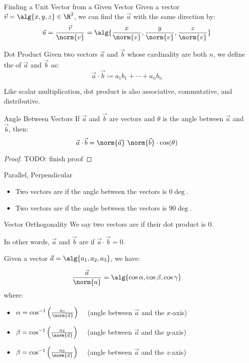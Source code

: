 \begin{tecbox}{Finding a Unit Vector from a Given Vector}{}
    Given a vector $\vec{v} = \alg{x, y, z} \in \R^3$, we can find the  $\vec{u}$ with the same direction by:
    \[ \vec{u} = \frac{\vec{v}}{\norm{v}} = \alg{\frac{x}{\norm{v}}, \frac{y}{\norm{v}}, \frac{z}{\norm{v}}} \]
\end{tecbox}

\begin{dfnbox}{Dot Product}{}
    Given two vectors $\vec{a}$ and $\vec{b}$ whose cardinality are both $n$, we define the  of $\vec{a}$ and $\vec{b}$ as:
    \[ \vec{a} \cdot \vec{b} \coloneq a_1b_1 + \cdots + a_nb_n \]
\end{dfnbox}

Like scalar multiplication, dot product is also associative, commutative, and distributive.

\begin{thmbox}{Angle Between Vectors}{}
    If $\vec{a}$ and $\vec{b}$ are vectors and $\theta$ is the angle between $\vec{a}$ and $\vec{b}$, then:
    \[ \vec{a} \cdot \vec{b} = \norm{\vec{a}} \ \norm{\vec{b}} \cdot \cos(\theta) \]
    \tcblower
    \begin{proof}
        TODO: finish proof
    \end{proof}
\end{thmbox}

\begin{dfnbox}{Parallel, Perpendicular}{}
    \begin{itemize}[noitemsep]
        \item Two vectors are  if the angle between the vectors is $0\deg$.
        \item Two vectors are  if the angle between the vectors is $90\deg$.
    \end{itemize}
\end{dfnbox}

\begin{dfnbox}{Vector Orthogonality}{}
    We say two vectors are  if their dot product is $0$.
\end{dfnbox}

In other words, $\vec{a}$ and $\vec{b}$ are  if $\vec{a} \cdot \vec{b} = 0$.

Given a vector $\vec{a} = \alg{a_1, a_2, a_3}$, we have:

\[ \frac{\vec{a}}{\norm{a}} = \alg{\cos \alpha, \cos \beta, \cos \gamma} \]
where:
\begin{itemize}
    \item $\alpha = \cos^{-1} \left( \frac{a_1}{\norm{\vec{a}}} \right) \quad$ (angle between $\vec{a}$ and the $x$-axis)
    \item $\beta = \cos^{-1} \left( \frac{a_2}{\norm{\vec{a}}} \right) \quad$ (angle between $\vec{a}$ and the $y$-axis)
    \item $\beta = \cos^{-1} \left( \frac{a_3}{\norm{\vec{a}}} \right) \quad$ (angle between $\vec{a}$ and the $z$-axis)
\end{itemize}

